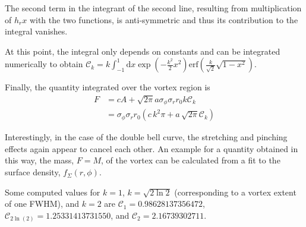 \documentclass[a4paper]{scrartcl}
\begin{document}
The second term in the integrant of the second line, resulting from multiplication of $h_r x$ with the two functions,
is anti-symmetric and thus its contribution to the integral vanishes.

At this point, the integral only depends on constants and can be integrated numerically to obtain $\mathcal{C}_k = k \int_{-1}^{1} \mathrm{d}x \exp\left( - \frac{k^2}{2} x^2\right)
  \mathrm{erf} \left( \frac{k}{\sqrt{2}} \sqrt{1 - x^2} \right)$.

Finally, the quantity integrated over the vortex region is
\begin{align}
  F & = c A + \sqrt{2\pi} a \sigma_\phi \sigma_r r_0 k \mathcal{C}_k                \\
    & = \sigma_\phi \sigma_r r_0 \left( c\, k^2 \pi + a \, \sqrt{2\pi} \mathcal{C}_k \right)
\end{align}

Interestingly, in the case of the double bell curve, the stretching and pinching effects again appear to cancel each other.
An example for a quantity obtained in this way, the mass, $F=M$, of the vortex can be calculated from a fit to the
surface density, $f_\Sigma(r, \phi)$.

Some computed values for $k=1$, $k=\sqrt{2\ln{2}}$ (corresponding to a vortex extent of one FWHM), and $k=2$ 
are $\mathcal{C}_1 = 0.98628137356472$,
$\mathcal{C}_{2\ln(2)} = 1.25331413731550$, and $\mathcal{C}_2 = 2.16739302711$.
\end{document}
